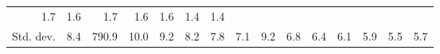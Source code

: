 \begin{tabular}{lllllllllllllll}
  \multicolumn{1}{r}{1.7} &
  \multicolumn{1}{r}{1.6} &
  \multicolumn{1}{r}{1.7} &
  \multicolumn{1}{r}{1.6} &
  \multicolumn{1}{r}{1.6} &
  \multicolumn{1}{r}{1.4} &
  \multicolumn{1}{r}{1.4} \\
\multicolumn{1}{l}{\hspace{2em}Std. dev.} &
  \multicolumn{1}{|r}{8.4} &
  \multicolumn{1}{r}{790.9} &
  \multicolumn{1}{r}{10.0} &
  \multicolumn{1}{r}{9.2} &
  \multicolumn{1}{r}{8.2} &
  \multicolumn{1}{r}{7.8} &
  \multicolumn{1}{r}{7.1} &
  \multicolumn{1}{r}{9.2} &
  \multicolumn{1}{r}{6.8} &
  \multicolumn{1}{r}{6.4} &
  \multicolumn{1}{r}{6.1} &
  \multicolumn{1}{r}{5.9} &
  \multicolumn{1}{r}{5.5} &
  \multicolumn{1}{r}{5.7} \\
\cline{1-15}
\end{tabular}
